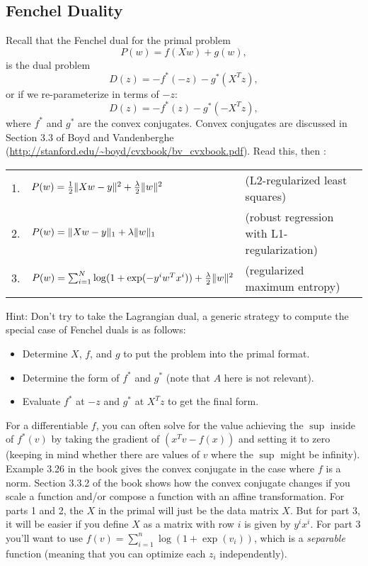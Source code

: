 \documentclass{article}
\begin{document}
\subsection{Fenchel Duality}


Recall that the Fenchel dual for the primal problem
\[
P(w) = f(Xw) + g(w),
\]
is the dual problem
\[
D(z) = - f^*(-z) - g^*(X^Tz),
\]
or if we re-parameterize in terms of $-z$:
\begin{equation}
\label{eq:FD2}
D(z) = - f^*(z) - g^*(-X^Tz),
\end{equation}
where $f^*$ and $g^*$ are the convex conjugates.
Convex conjugates are discussed in Section 3.3 of Boyd and Vandenberghe (\url{http://stanford.edu/~boyd/cvxbook/bv_cvxbook.pdf}). Read this, then :
\begin{center}
\begin{tabular}{lll}
1. & $P(w) = \frac{1}{2}\|Xw - y\|^2 +  \frac{\lambda}{2}\|w\|^2$ & (L2-regularized least squares)\\
2. & $P(w) = \|Xw -y\|_1 + \lambda\|w\|_1$ & (robust regression with L1-regularization)\\
3. & $P(w) = \sum_{i=1}^N \log(1+\exp(-y^iw^Tx^i)) + \frac{\lambda}{2}\|w\|^2$ & (regularized maximum entropy)
\end{tabular}
\end{center}
Hint: Don't try to take the Lagrangian dual, a generic strategy to compute the special case of Fenchel duals is as follows:
\begin{itemize}
\item Determine $X$, $f$, and $g$ to put the problem into the primal format.
\item Determine the form of $f^*$ and $g^*$ (note that $A$ here is not relevant).
\item Evaluate $f^*$ at $-z$ and $g^*$ at $X^Tz$ to get the final form.
\end{itemize}
For a differentiable $f$, you can often solve for the value achieving the $\sup$ inside of $f^*(v)$ by taking the gradient of $(x^Tv - f(x))$ and setting it to zero (keeping in mind whether there are values of $v$ where the $\sup$ might be infinity). Example 3.26 in the book gives the convex conjugate in the case where $f$ is a norm. Section 3.3.2 of the book shows how the convex conjugate changes if you scale a function and/or compose a function with an affine transformation. For parts 1 and 2, the $X$ in the primal will just be the data matrix $X$. But for part 3, it will be easier if you define $X$ as a matrix with row $i$ is given by $y^ix^i$. For part 3 you'll want to use $f(v) = \sum_{i=1}^n \log(1 + \exp(v_i))$, which is a \emph{separable} function (meaning that you can optimize each $z_i$ independently).
\end{document}
